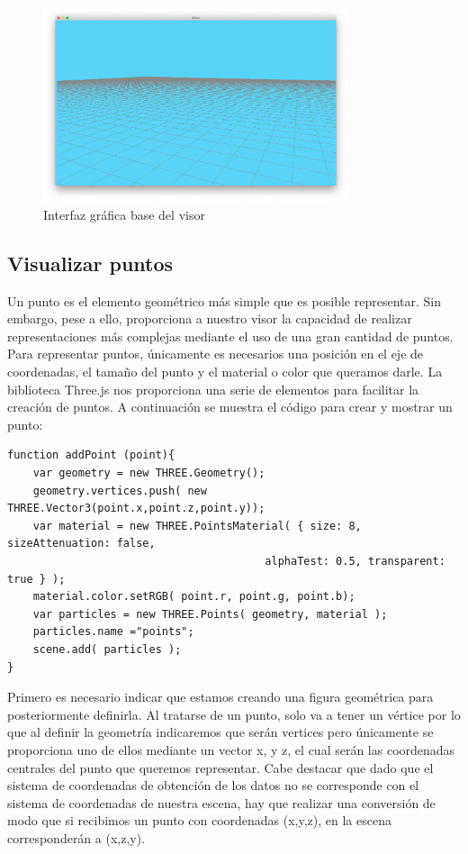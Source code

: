 \begin{figure}[H]
  \begin{center}
    \includegraphics[width=0.8\textwidth]{figures/interfazinicial.png}
		\caption{Interfaz gráfica base del visor}
		\label{fig.interfazinicial}
		\end{center}
\end{figure}

\subsection{Visualizar puntos}
Un punto es el elemento geométrico más simple que es posible representar. Sin embargo, pese a ello, proporciona a nuestro visor la capacidad de realizar representaciones más complejas mediante el uso de una gran cantidad de puntos. Para representar puntos, únicamente es necesarios una posición en el eje de coordenadas, el tamaño del punto y el material o color que queramos darle. 
La biblioteca Three.js nos proporciona una serie de elementos para facilitar la creación de puntos. A continuación se muestra el código para crear y mostrar un punto:
\begin{lstlisting}[frame=single]
function addPoint (point){
	var geometry = new THREE.Geometry();
	geometry.vertices.push( new THREE.Vector3(point.x,point.z,point.y));
	var material = new THREE.PointsMaterial( { size: 8, sizeAttenuation: false, 
										alphaTest: 0.5, transparent: true } );
	material.color.setRGB( point.r, point.g, point.b);
	var particles = new THREE.Points( geometry, material );
	particles.name ="points";
	scene.add( particles );
}
\end{lstlisting}
Primero es necesario indicar que estamos creando una figura geométrica para posteriormente definirla. Al tratarse de un punto, solo va a tener un vértice por lo que al definir la geometría indicaremos que serán vertices pero únicamente se proporciona uno de ellos mediante un vector x, y z, el cual serán las coordenadas centrales del punto que queremos representar. Cabe destacar que dado que el sistema de coordenadas de obtención de los datos no se corresponde con el sistema de coordenadas de nuestra escena, hay que realizar una conversión de modo que si recibimos un punto con coordenadas (x,y,z), en la escena corresponderán a (x,z,y). 


